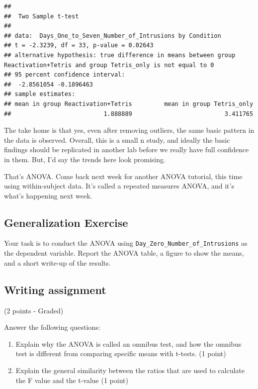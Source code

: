 \documentclass[
]{book}
\begin{document}
\begin{verbatim}
## 
##  Two Sample t-test
## 
## data:  Days_One_to_Seven_Number_of_Intrusions by Condition
## t = -2.3239, df = 33, p-value = 0.02643
## alternative hypothesis: true difference in means between group Reactivation+Tetris and group Tetris_only is not equal to 0
## 95 percent confidence interval:
##  -2.8561054 -0.1896463
## sample estimates:
## mean in group Reactivation+Tetris         mean in group Tetris_only 
##                          1.888889                          3.411765
\end{verbatim}

The take home is that yes, even after removing outliers, the same basic pattern in the data is observed. Overall, this is a small n study, and ideally the basic findings should be replicated in another lab before we really have full confidence in them. But, I'd say the trends here look promising.

That's ANOVA. Come back next week for another ANOVA tutorial, this time using within-subject data. It's called a repeated measures ANOVA, and it's what's happening next week.

\hypertarget{generalization-exercise-5}{%
\subsection{Generalization Exercise}\label{generalization-exercise-5}}

Your task is to conduct the ANOVA using \texttt{Day\_Zero\_Number\_of\_Intrusions} as the dependent variable. Report the ANOVA table, a figure to show the means, and a short write-up of the results.

\hypertarget{writing-assignment-5}{%
\subsection{Writing assignment}\label{writing-assignment-5}}

(2 points - Graded)

Answer the following questions:

\begin{enumerate}
\def\labelenumi{\arabic{enumi}.}
\item
  Explain why the ANOVA is called an omnibus test, and how the omnibus test is different from comparing specific means with t-tests. (1 point)
\item
  Explain the general similarity between the ratios that are used to calculate the F value and the t-value (1 point)
\end{enumerate}
\end{document}
